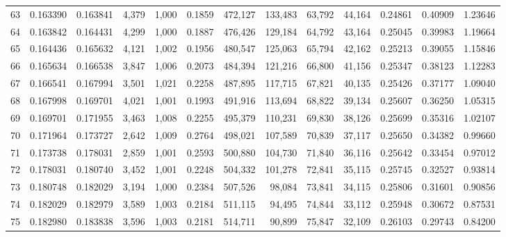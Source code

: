 \begin{tabular}{rrrrrrrrrrrrr}
63  &  0.163390 &  0.163841 &   4,379 &  1,000 &                                     0.1859 &  472,127 &  133,483 &   63,792 &   44,164 &  0.24861 &  0.40909 &  1.23646 \\
64  &  0.163842 &  0.164431 &   4,299 &  1,000 &                                     0.1887 &  476,426 &  129,184 &   64,792 &   43,164 &  0.25045 &  0.39983 &  1.19664 \\
65  &  0.164436 &  0.165632 &   4,121 &  1,002 &                                     0.1956 &  480,547 &  125,063 &   65,794 &   42,162 &  0.25213 &  0.39055 &  1.15846 \\
66  &  0.165634 &  0.166538 &   3,847 &  1,006 &                                     0.2073 &  484,394 &  121,216 &   66,800 &   41,156 &  0.25347 &  0.38123 &  1.12283 \\
67  &  0.166541 &  0.167994 &   3,501 &  1,021 &                                     0.2258 &  487,895 &  117,715 &   67,821 &   40,135 &  0.25426 &  0.37177 &  1.09040 \\
68  &  0.167998 &  0.169701 &   4,021 &  1,001 &                                     0.1993 &  491,916 &  113,694 &   68,822 &   39,134 &  0.25607 &  0.36250 &  1.05315 \\
69  &  0.169701 &  0.171955 &   3,463 &  1,008 &                                     0.2255 &  495,379 &  110,231 &   69,830 &   38,126 &  0.25699 &  0.35316 &  1.02107 \\
70  &  0.171964 &  0.173727 &   2,642 &  1,009 &                                     0.2764 &  498,021 &  107,589 &   70,839 &   37,117 &  0.25650 &  0.34382 &  0.99660 \\
71  &  0.173738 &  0.178031 &   2,859 &  1,001 &                                     0.2593 &  500,880 &  104,730 &   71,840 &   36,116 &  0.25642 &  0.33454 &  0.97012 \\
72  &  0.178031 &  0.180740 &   3,452 &  1,001 &                                     0.2248 &  504,332 &  101,278 &   72,841 &   35,115 &  0.25745 &  0.32527 &  0.93814 \\
73  &  0.180748 &  0.182029 &   3,194 &  1,000 &                                     0.2384 &  507,526 &   98,084 &   73,841 &   34,115 &  0.25806 &  0.31601 &  0.90856 \\
74  &  0.182029 &  0.182979 &   3,589 &  1,003 &                                     0.2184 &  511,115 &   94,495 &   74,844 &   33,112 &  0.25948 &  0.30672 &  0.87531 \\
75  &  0.182980 &  0.183838 &   3,596 &  1,003 &                                     0.2181 &  514,711 &   90,899 &   75,847 &   32,109 &  0.26103 &  0.29743 &  0.84200 \\

\end{tabular}
